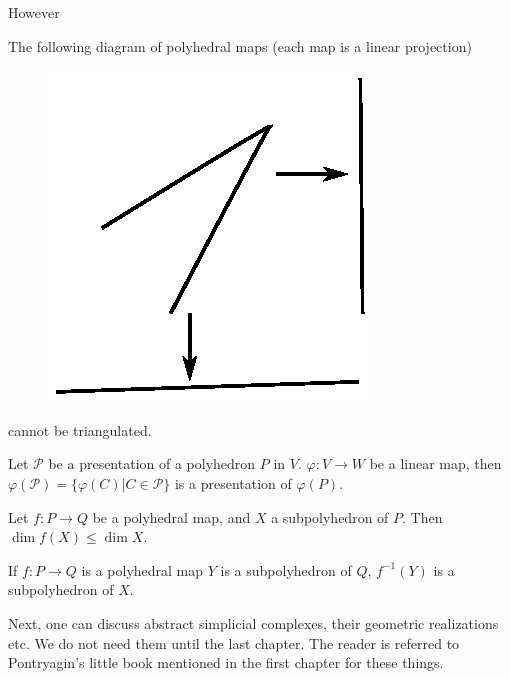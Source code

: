 However

\begin{ex}\label{chap1-ex2.2.9}
The following diagram of polyhedral maps (each map is a linear projection)
\begin{figure}[H]
\centering
\includegraphics{figure/fig7.eps}
\end{figure}
\noindent
cannot be triangulated.
\end{ex}

\begin{ex}\label{chap1-ex2.2.10}
Let $\mathscr{P}$ be a presentation of a polyhedron $P$ in $V$. $\varphi:V\to W$ be a linear map, then $\varphi(\mathscr{P})=\{\varphi(C)|C\in\mathscr{P}\}$ is a presentation of $\varphi(P)$.
\end{ex}

\begin{ex}\label{chap1-ex2.2.11}
Let $f:P\to Q$ be a polyhedral map, and $X$ a subpolyhedron of $P$. Then $\dim f(X)\leq \dim X$.
\end{ex}

\begin{ex}\label{chap1-ex2.2.12}
If $f:P\to Q$ is a polyhedral map $Y$ is a subpolyhedron of $Q$, $f^{-1}(Y)$ is a subpolyhedron of $X$.
\end{ex}

Next, one can discuss abstract simplicial complexes, their geometric realizations etc. We do not need them until the last chapter. The reader is referred to Pontryagin's little book mentioned in the first chapter for these things.




